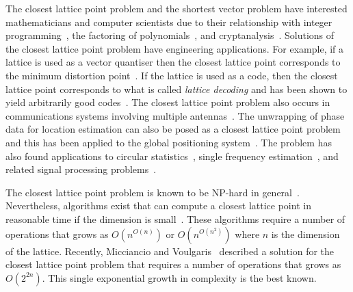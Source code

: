 \documentclass[final,leqno]{siamltex}
\begin{document}
The closest lattice point problem and the shortest vector problem have interested mathematicians and computer scientists due to their relationship with integer programming~\cite{Lenstra_integerprogramming1983,Kannan1987_fast_general_np,Babai1986}, the factoring of polynomials~\cite{Lenstra1982}, and cryptanalysis~\cite{Joux_toolbox_cryptanal1998,NyguyenStern_two_faces_crypto,Micciancio_lattice_based_post_quantum_crypto}.  
Solutions of the closest lattice point problem have engineering applications.  For example, if a lattice is used as a vector quantiser then the closest lattice point corresponds to the minimum distortion point~\cite{Conway1983VoronoiCodes,Conway1982VoronoiRegions,Conway1982FastQuantDec}.  If the lattice is used as a code, then the closest lattice point corresponds to what is called \emph{lattice decoding} and has been shown to yield arbitrarily good codes~\cite{Erex2004_lattice_decoding,Erez2005}.  The closest lattice point problem also occurs in communications systems involving multiple antennas~\cite{Ryan2008,Wubben_2011}.  The unwrapping of phase data for location estimation can also be posed as a closest lattice point problem and this has been applied to the global positioning system~\cite{Teunissen_GPS_1995,Hassibi_GPS_1998}.  The problem has also found applications to circular statistics~\cite{McKilliam_mean_dir_est_sq_arc_length2010}, single frequency estimation~\cite{McKilliamFrequencyEstimationByPhaseUnwrapping2009}, and related signal processing problems~\cite{McKilliam2007,Clarkson2007,McKilliam2009IndentifiabliltyAliasingPolyphase,Quinn_sparse_noisy_SSP_2012}.

The closest lattice point problem is known to be NP-hard in general~\cite{micciancio_hardness_2001, Dinur2003_approximating_CVP_NP_hard,Regev_2004_inappox_lattice_with_preprocessing,feige_inapproximability_2004,Jalden2005_sphere_decoding_complexity}. Nevertheless, algorithms exist that can compute a closest lattice point in reasonable time if the dimension is small~\cite{Pohst_sphere_decoder_1981,Kannan1987_fast_general_np,Agrell2002}.  These algorithms require a number of operations that grows as $O(n^{O(n)})$ or $O(n^{O(n^2)})$ where $n$ is the dimension of the lattice.  Recently, Micciancio and Voulgaris~\cite{MicciancioVoulgaris_deterministic_jv_2013} described a solution for the closest lattice point problem that requires a number of operations that grows as $O(2^{2n})$.  This single exponential growth in complexity is the best known. 
\end{document}
